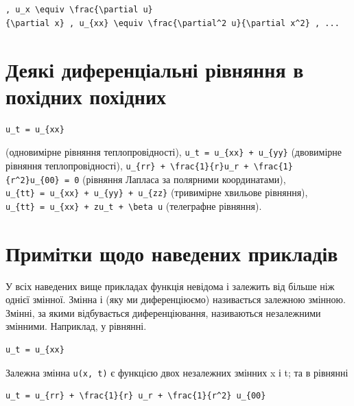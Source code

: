 \documentclass[
  ukrainian,
]{article}
\begin{document}
\texttt{,\ \textquotesingle{}u\_x\ \textbackslash{}equiv\ \textbackslash{}frac\{\textbackslash{}partial\ u\}\{\textbackslash{}partial\ x\}\textquotesingle{}\ ,\ \textquotesingle{}u\_\{xx\}\ \textbackslash{}equiv\ \textbackslash{}frac\{\textbackslash{}partial\^{}2\ u\}\{\textbackslash{}partial\ x\^{}2\}\textquotesingle{}\ ,\ ...}

\section{Деякі диференціальні рівняння в похідних
похідних}\label{ux434ux435ux44fux43aux456-ux434ux438ux444ux435ux440ux435ux43dux446ux456ux430ux43bux44cux43dux456-ux440ux456ux432ux43dux44fux43dux43dux44f-ux432-ux43fux43eux445ux456ux434ux43dux438ux445-ux43fux43eux445ux456ux434ux43dux438ux445}

\begin{verbatim}
u_t = u_{xx}
\end{verbatim}

(одновимірне рівняння теплопровідності),
\texttt{u\_t\ =\ u\_\{xx\}\ +\ u\_\{yy\}} (двовимірне рівняння
теплопровідності),
\texttt{u\_\{rr\}\ +\ \textbackslash{}frac\{1\}\{r\}u\_r\ +\ \textbackslash{}frac\{1\}\{r\^{}2\}u\_\{00\}\ =\ 0}
(рівняння Лапласа за полярними координатами),
\texttt{u\_\{tt\}\ =\ u\_\{xx\}\ +\ u\_\{yy\}\ +\ u\_\{zz\}} (тривимірне
хвильове рівняння),
\texttt{u\_\{tt\}\ =\ u\_\{xx\}\ +\ zu\_t\ +\ \textbackslash{}beta\ u}
(телеграфне рівняння).

\section{Примітки щодо наведених
прикладів}\label{ux43fux440ux438ux43cux456ux442ux43aux438-ux449ux43eux434ux43e-ux43dux430ux432ux435ux434ux435ux43dux438ux445-ux43fux440ux438ux43aux43bux430ux434ux456ux432}

У всіх наведених вище прикладах функція невідома і залежить від більше
ніж однієї змінної. Змінна і (яку ми диференціюємо) називається залежною
змінною. Змінні, за якими відбувається диференціювання, називаються
незалежними змінними. Наприклад, у рівнянні.

\begin{verbatim}
u_t = u_{xx}
\end{verbatim}

Залежна змінна \texttt{u(x,\ t)} є функцією двох незалежних змінних x і
t; та в рівнянні

\begin{verbatim}
u_t = u_{rr} + \frac{1}{r} u_r + \frac{1}{r^2} u_{00}
\end{verbatim}
\end{document}
